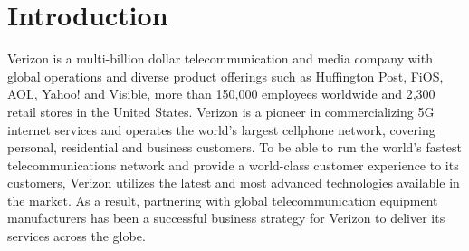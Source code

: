 \documentclass[inte,nonblindrev]{informs3} %
\begin{document}
%

\section{Introduction}
Verizon is a multi-billion dollar telecommunication and media company with global operations and diverse product offerings such as Huffington Post, FiOS, AOL, Yahoo! and Visible, more than 150,000 employees worldwide and 2,300 retail stores in the United States. Verizon is a pioneer in commercializing 5G internet services and operates the world's largest cellphone network, covering personal, residential and business customers. To be able to run the world's fastest telecommunications network and provide a world-class customer experience to its customers, Verizon utilizes the latest and most advanced technologies available in the market. As a result, partnering with global telecommunication equipment manufacturers has been a successful business strategy for Verizon to deliver its services across the globe.
\end{document}
